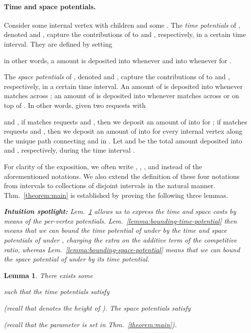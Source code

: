 \documentclass[11pt]{article}
\def\ShortVersion{}
\def\ShortVersionEnd{}
\newtheorem{lemma}[theorem]{Lemma}
\theoremstyle{definition}
\theoremstyle{plain}
\newtheorem{lemma}[theorem]{Lemma}
\theoremstyle{definition}
\theoremstyle{plain}
\newtheorem{lemma}{Lemma}[section]
\theoremstyle{definition}
\theoremstyle{plain}
\newenvironment{IntuitionSpotlight}[0]
{\par \setlength{\leftskip}{0.5\parindent}\setlength{\rightskip}{0.5\parindent}\noindent\itshape\textbf{Intuition spotlight:}}
{\par\ignorespacesafterend}
\newcommand{\NotationLabel}[1]{\label{notationTable:#1}\ignorespaces}
\newcommand{\Thm}{Thm.}
\newcommand{\Lem}{Lem.}
\begin{document}
\paragraph{Time and space potentials.}
Consider some internal vertex  with children  and some
.
The \emph{time potentials} of , denoted 
and ,
capture the contributions of  to  and
, respectively, in a certain time interval.
They are defined by setting

\NotationLabel{analysis:tau}
\NotationLabel{analysis:adv-tau}
in other words, a  amount is deposited into  whenever  and into  whenever 
for .

\ShortVersion \sloppy \ShortVersionEnd
The \emph{space potentials} of , denoted 
\NotationLabel{analysis:sigma}
and ,
\NotationLabel{analysis:adv-sigma}
capture the contributions of  to  and
, respectively, in a certain time interval.
An amount of  is deposited into  whenever  matches
across ;
an amount of  is deposited into  whenever
 matches across or on top of .
In other words, given two requests  with

and
,
if  matches requests  and ,
then we deposit an amount of  into  for
;
if  matches requests  and ,
then we deposit an amount of  into  for every internal
vertex  along the unique path connecting  and  in .
Let  and  be the
total amount deposited into  and , respectively,
during the time interval .
\ShortVersion \par\fussy \ShortVersionEnd

For clarity of the exposition, we often write ,
, , and
 instead of the aforementioned notations.
We also extend the definition of these four notations from intervals to
collections of disjoint intervals in the natural manner.
\Thm{}~\ref{theorem:main} is established by proving the following three
lemmas.

\begin{IntuitionSpotlight}
\Lem{}~\ref{lemma:expressing-costs-by-potentials} allows us to
express the time and space costs by means of the per-vertex potentials.
\Lem{}~\ref{lemma:bounding-time-potential} then means that we can
bound the time potential of  under  by the time and space potentials of
 under , charging the extra  on the additive term of the
competitive ratio, whereas \Lem{}~\ref{lemma:bounding-space-potential} means
that we can bound the space potential of  under  by its time
potential.
\end{IntuitionSpotlight}

\begin{lemma} \label{lemma:expressing-costs-by-potentials}
There exists some

such that the time potentials satisfy

(recall that  denotes the height of ).
The space potentials satisfy

(recall that the parameter  is set in \Thm{}~\ref{theorem:main}).
\end{lemma}
\end{document}
